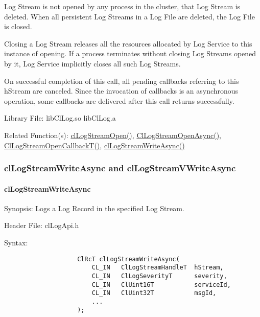 \begin{flushleft}
\begin{Desc}
Log Stream is not opened by any process in the cluster, that Log Stream is deleted. When all persistent Log Streams in a Log File are
deleted, the Log File is closed.
\par
Closing a Log Stream releases all the resources allocated by Log Service to this instance of opening. If a process terminates without closing Log Streams
opened by it, Log Service implicitly closes all such Log Streams.
\par
On successful completion of this call, all pending callbacks referring to this hStream are canceled. Since the invocation of callbacks is an 
asynchronous operation, some callbacks are delivered after this call returns successfully.

\end{Desc}
\begin{Desc}
\item[Library File:] libClLog.so
\newline
libClLog.a
\end{Desc}
\begin{Desc}
\item[Related Function(s):]\hyperlink{pagelog106}{clLogStreamOpen()}, \hyperlink{pagelog106}{ClLogStreamOpenAsync()}, 
\hyperlink{pagelog107}{ClLogStreamOpenCallbackT()}, \hyperlink{pagelog109}{clLogStreamWriteAsync()}
\end{Desc}
\newpage



\subsubsection{clLogStreamWriteAsync and clLogStreamVWriteAsync}
\hypertarget{pagelog109}{}\paragraph{cl\-Log\-Stream\-Write\-Async}\label{pagelog109}
\begin{Desc}
\item[Synopsis:] Logs a Log Record in the specified Log Stream.\end{Desc}
\begin{Desc}
\item[Header File:] clLogApi.h \end{Desc}
\begin{Desc}
\item[Syntax:]
\footnotesize\begin{verbatim}        	
					ClRcT clLogStreamWriteAsync(
						CL_IN	ClLogStreamHandleT	hStream, 
						CL_IN	ClLogSeverityT		severity,
						CL_IN	ClUint16T			serviceId,
						CL_IN	ClUint32T			msgId,
						...
					);
					

\end{verbatim}
\end{Desc}
\end{flushleft}
